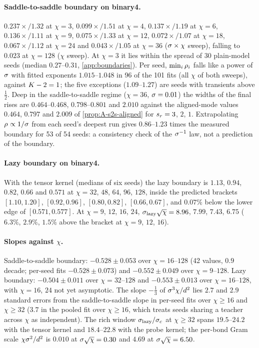 \paragraph{Saddle-to-saddle boundary on binary4.}
\empirical{} $0.237\times/1.32$ at $\chi=3$, $0.099\times/1.51$ at $\chi=4$, $0.137\times/1.19$ at $\chi=6$,
$0.136\times/1.11$ at $\chi=9$, $0.075\times/1.33$ at $\chi=12$, $0.072\times/1.07$ at $\chi=18$, $0.067\times/1.12$
at $\chi=24$ and $0.043\times/1.05$ at $\chi=36$ ($\sigma\times\chi$ sweep), falling to $0.023$ at $\chi=128$ ($\chi$
sweep). At $\chi=3$ it lies within the spread of 30 plain-model seeds (median $0.27$--$0.31$,
\cref{app:boundaries}). Per seed, $\min_i\rho_{i}$ falls like a power of $\sigma$ with fitted exponents $1.015$--$1.048$
in 96 of the 101 fits (all $\chi$ of both sweeps), against $K-2=1$; the five exceptions ($1.09$--$1.27$) are seeds
with transients above $\frac12$. Deep in the saddle-to-saddle regime ($\chi=36$, $\sigma=0.01$) the widths of the final
rises are $0.464$--$0.468$, $0.798$--$0.801$ and $2.010$ against the aligned-mode values $0.464$, $0.797$ and
$2.009$ of \cref{prop:A-s2s-aligned} for $s_{r}=3$, $2$, $1$. Extrapolating $\rho_{}\propto1/\sigma$ from each seed's
deepest run gives $0.86$--$1.23$ times the measured boundary for 53 of 54 seeds: a consistency check of the
$\sigma^{-1}$ law, not a prediction of the boundary.

\paragraph{Lazy boundary on binary4.}
\empirical{} With the tensor kernel (medians of six seeds) the lazy boundary is $1.13$, $0.94$, $0.82$, $0.66$
and $0.571$ at $\chi=32$, $48$, $64$, $96$, $128$, inside the predicted brackets $[1.10,1.20]$, $[0.92,0.96]$,
$[0.80,0.82]$, $[0.66,0.67]$, and $0.07\%$ below the lower edge of $[0.571,0.577]$. At $\chi=9$, $12$, $16$, $24$,
$\sigma_{\rm lazy}\sqrt\chi=8.96$, $7.99$, $7.43$, $6.75$ ($6.3\%$, $2.9\%$, $1.5\%$ above the bracket at $\chi=9$, $12$,
$16$).

\paragraph{Slopes against $\chi$.}
\empirical{} Saddle-to-saddle boundary: $-0.528\pm0.053$ over $\chi=16$--$128$ (42 values, $0.9$ decade; per-seed
fits $-0.528\pm0.073$) and $-0.552\pm0.049$ over $\chi=9$--$128$. Lazy boundary: $-0.504\pm0.011$ over
$\chi=32$--$128$ and $-0.553\pm0.013$ over $\chi=16$--$128$, with $\chi=16$, $24$ not yet asymptotic. The slope
$-\frac13$ of $\sigma^3\chi/d^2$ lies $2.7$ and $2.9$ standard errors from the saddle-to-saddle slope in per-seed
fits over $\chi\ge16$ and $\chi\ge32$ ($3.7$ in the pooled fit over $\chi\ge16$, which treats seeds sharing a
teacher across $\chi$ as independent). The rich window $\sigma_{\rm lazy}/\sigma_c$ at $\chi\ge32$ spans $19.5$--$24.2$
with the tensor kernel and $18.4$--$22.8$ with the probe kernel; the per-bond Gram scale $\chi\sigma^2/d^2$ is
$0.010$ at $\sigma\sqrt\chi=0.30$ and $4.69$ at $\sigma\sqrt\chi=6.50$.

